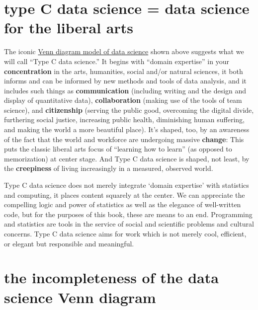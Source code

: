 \documentclass[openany]{book}
\begin{document}
\hypertarget{type-c-data-science-data-science-for-the-liberal-arts}{%
\section{type C data science = data science for the liberal arts}\label{type-c-data-science-data-science-for-the-liberal-arts}}

The iconic \href{https://www.google.com/search?q=venn+diagram+model+of+data+science\&newwindow=1\&safe=active\&rlz=1C1CHBF_enUS762US763\&tbm=isch\&tbo=u\&source=univ\&sa=X\&ved=0ahUKEwiM_abBtY7XAhXDQCYKHdgyB58QsAQIOg\&biw=1378}{Venn diagram model of data science} shown above suggests what we will call ``Type C data science.'' It begins with ``domain expertise'' in your \textbf{concentration} in the arts, humanities, social and/or natural sciences, it both informs and can be informed by new methods and tools of data analysis, and it includes such things as \textbf{communication} (including writing and the design and display of quantitative data), \textbf{collaboration} (making use of the tools of team science), and \textbf{citizenship} (serving the public good, overcoming the digital divide, furthering social justice, increasing public health, diminishing human suffering, and making the world a more beautiful place). It's shaped, too, by an awareness of the fact that the world and workforce are undergoing massive \textbf{change}: This puts the classic liberal arts focus of ``learning how to learn'' (as opposed to memorization) at center stage. And Type C data science is shaped, not least, by the \textbf{creepiness} of living increasingly in a measured, observed world.

Type C data science does not merely integrate `domain expertise' with statistics and computing, it places content squarely at the center. We can appreciate the compelling logic and power of statistics as well as the elegance of well-written code, but for the purposes of this book, these are means to an end. Programming and statistics are tools in the service of social and scientific problems and cultural concerns. Type C data science aims for work which is not merely cool, efficient, or elegant but responsible and meaningful.

\hypertarget{the-incompleteness-of-the-data-science-venn-diagram}{%
\section{the incompleteness of the data science Venn diagram}\label{the-incompleteness-of-the-data-science-venn-diagram}}
\end{document}
